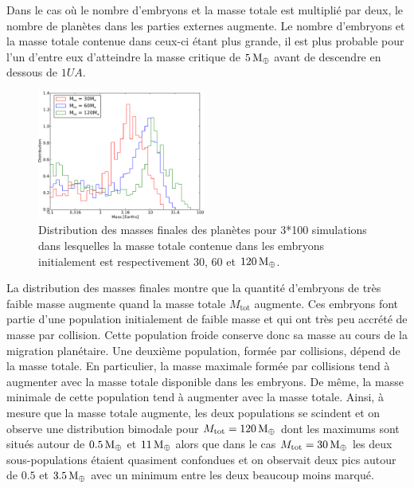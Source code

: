 Dans le cas où le nombre d'embryons et la masse totale est multiplié par deux, le nombre de planètes dans les parties externes augmente. Le nombre d'embryons et la masse totale contenue dans ceux-ci étant plus grande, il est plus probable pour l'un d'entre eux d'atteindre la masse critique de $5\mathrm{\thinspace M_\oplus}$ avant de descendre en dessous de $1\unit{UA}$. 

\begin{figure}[htbp]
\centering
\includegraphics[width=0.49\textwidth]{figure/HSE/m_tot_hist_m.pdf}

\caption[Masses finales des planètes en fonction de la masse initiale totale.]{Distribution des masses finales des planètes pour
3*100 simulations dans lesquelles la masse totale contenue dans les embryons initialement est respectivement $30$, $60$ et
$120\mathrm{\thinspace M_\oplus}$.}\label{fig:HSE_m_tot_hist_m}
\end{figure}

La distribution des masses finales  montre que la quantité d'embryons de très faible masse augmente quand la masse totale $M_\text{tot}$ augmente. Ces embryons font partie d'une population initialement de faible masse et qui ont très peu accrété de masse par collision. Cette population froide conserve donc sa masse au cours de la migration planétaire. Une deuxième population, formée par collisions, dépend de la masse totale. En particulier, la masse maximale formée par collisions tend à augmenter avec la masse totale disponible dans les embryons. De même, la masse minimale de cette population tend à augmenter avec la masse totale. Ainsi, à mesure que la masse totale augmente, les deux populations se scindent et on observe une distribution bimodale pour $M_\text{tot}=120\mathrm{\thinspace M_\oplus}$ dont les maximums sont situés autour de $0.5\mathrm{\thinspace M_\oplus}$ et $11\mathrm{\thinspace M_\oplus}$ alors que dans le cas $M_\text{tot}=30\mathrm{\thinspace M_\oplus}$ les deux sous-populations étaient quasiment confondues et on observait deux pics autour de 
$0.
5$ et $3.5\mathrm{\thinspace M_\oplus}$ avec un minimum entre les deux beaucoup moins marqué.

